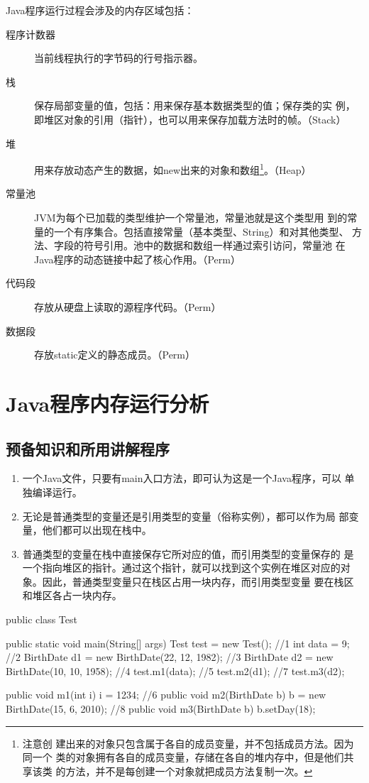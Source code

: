 Java程序运行过程会涉及的内存区域包括：

\begin{description}
\item[程序计数器] 当前线程执行的字节码的行号指示器。
\item[栈] 保存局部变量的值，包括：用来保存基本数据类型的值；保存类的实
  例，即堆区对象的引用（指针），也可以用来保存加载方法时的帧。（Stack）
\item[堆] 用来存放动态产生的数据，如new出来的对象和数组\footnote{注意创
    建出来的对象只包含属于各自的成员变量，并不包括成员方法。因为同一个
    类的对象拥有各自的成员变量，存储在各自的堆内存中，但是他们共享该类
    的方法，并不是每创建一个对象就把成员方法复制一次。}。（Heap）
\item[常量池] JVM为每个已加载的类型维护一个常量池，常量池就是这个类型用
  到的常量的一个有序集合。包括直接常量（基本类型、String）和对其他类型、
  方法、字段的符号引用。池中的数据和数组一样通过索引访问，常量池
  在Java程序的动态链接中起了核心作用。（Perm）
\item[代码段] 存放从硬盘上读取的源程序代码。（Perm）
\item[数据段] 存放static定义的静态成员。{\Red （Perm）} 
\end{description}

\section{Java程序内存运行分析}

\subsection{预备知识和所用讲解程序}

\begin{enumerate}
\item 一个Java文件，只要有main入口方法，即可认为这是一个Java程序，可以
  单独编译运行。
\item 无论是普通类型的变量还是引用类型的变量（俗称实例），都可以作为局
  部变量，他们都可以出现在栈中。
\item 普通类型的变量在栈中直接保存它所对应的值，而引用类型的变量保存的
  是一个指向堆区的指针。通过这个指针，就可以找到这个实例在堆区对应的对
  象。因此，{\hei\Red 普通类型变量只在栈区占用一块内存，而引用类型变量
    要在栈区和堆区各占一块内存}。
\end{enumerate}


\begin{javaCode}
  public class Test {
    public static void main(String[] args) {
      Test test = new Test(); //1
      int data = 9; //2
      BirthDate d1 = new BirthDate(22, 12, 1982); //3
      BirthDate d2 = new BirthDate(10, 10, 1958); //4
      test.m1(data); //5
      test.m2(d1); //7
      test.m3(d2);
    }

    public void m1(int i) {
      i = 1234; //6
    }
    public void m2(BirthDate b) {
      b = new BirthDate(15, 6, 2010); //8
    }
    public void m3(BirthDate b) {
      b.setDay(18);
    }
  }
\end{javaCode}

